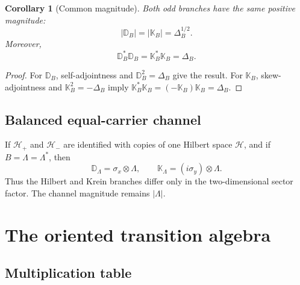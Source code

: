 \documentclass[11pt,reqno]{scrartcl}
\newcommand{\scrHp}{\mathscr H_{+}}
\newcommand{\scrHm}{\mathscr H_{-}}
\newcommand{\DB}{\mathbb D}
\newcommand{\KB}{\mathbb K}
\newcommand{\DeltaB}{\Delta}
\theoremstyle{plain}
\newtheorem{corollary}[corollary]{Corollary}
\theoremstyle{definition}
\theoremstyle{remark}
\begin{document}
\begin{corollary}[Common magnitude]
\label{cor:common-magnitude}
Both odd branches have the same positive magnitude:
\begin{equation}
  |\DB_B|=|\KB_B|=\DeltaB_B^{1/2}.
\end{equation}
Moreover,
\begin{equation}
  \DB_B^*\DB_B
  =\KB_B^*\KB_B
  =\DeltaB_B.
\end{equation}
\end{corollary}

\begin{proof}
For \(\DB_B\), self-adjointness and \(\DB_B^2=\DeltaB_B\) give the result.
For \(\KB_B\), skew-adjointness and \(\KB_B^2=-\DeltaB_B\) imply
\(\KB_B^*\KB_B=(-\KB_B)\KB_B=\DeltaB_B\).
\end{proof}

\subsection{Balanced equal-carrier channel}

If \(\scrHp\) and \(\scrHm\) are identified with copies of one Hilbert space
\(\mathscr H\), and if \(B=\Lambda=\Lambda^*\), then
\begin{equation}
  \DB_\Lambda=\sigma_x\otimes\Lambda,
  \qquad
  \KB_\Lambda=(i\sigma_y)\otimes\Lambda.
  \label{eq:balanced-branches}
\end{equation}
Thus the Hilbert and Krein branches differ only in the two-dimensional sector
factor. The channel magnitude remains \(|\Lambda|\).


\section{The oriented transition algebra}
\label{sec:algebra}

\subsection{Multiplication table}
\end{document}

